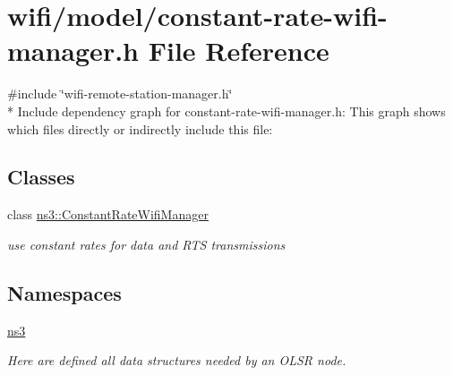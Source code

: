 \hypertarget{constant-rate-wifi-manager_8h}{}\section{wifi/model/constant-\/rate-\/wifi-\/manager.h File Reference}
\label{constant-rate-wifi-manager_8h}
{\ttfamily \#include \char`\"{}wifi-\/remote-\/station-\/manager.\+h\char`\"{}}\\*
Include dependency graph for constant-\/rate-\/wifi-\/manager.h\+:
This graph shows which files directly or indirectly include this file\+:
\subsection*{Classes}
\begin{DoxyCompactItemize}
\item 
class \hyperlink{classns3_1_1ConstantRateWifiManager}{ns3\+::\+Constant\+Rate\+Wifi\+Manager}
\begin{DoxyCompactList}\small\item\em use constant rates for data and R\+TS transmissions \end{DoxyCompactList}\end{DoxyCompactItemize}
\subsection*{Namespaces}
\begin{DoxyCompactItemize}
\item 
 \hyperlink{namespacens3}{ns3}
\begin{DoxyCompactList}\small\item\em Here are defined all data structures needed by an O\+L\+SR node. \end{DoxyCompactList}\end{DoxyCompactItemize}

